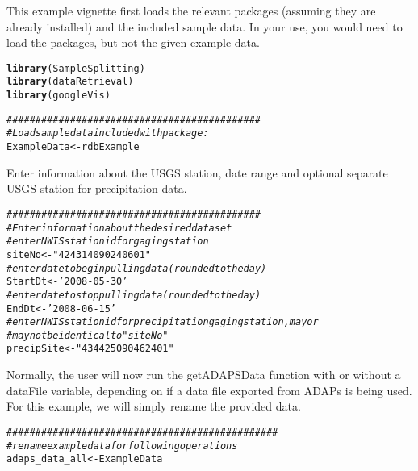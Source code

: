 \documentclass[a4paper,11pt]{article}\usepackage[]{graphicx}\usepackage[]{color}
\makeatletter
\newcommand{\hlstr}[1]{\textcolor[rgb]{0.192,0.494,0.8}{#1}}%
\newcommand{\hlcom}[1]{\textcolor[rgb]{0.678,0.584,0.686}{\textit{#1}}}%
\newcommand{\hlstd}[1]{\textcolor[rgb]{0.345,0.345,0.345}{#1}}%
\newcommand{\hlkwb}[1]{\textcolor[rgb]{0.69,0.353,0.396}{#1}}%
\newcommand{\hlkwd}[1]{\textcolor[rgb]{0.737,0.353,0.396}{\textbf{#1}}}%
\newenvironment{kframe}{%
 \def\at@end@of@kframe{}%
 \ifinner\ifhmode%
  \def\at@end@of@kframe{\end{minipage}}%
  \begin{minipage}{\columnwidth}%
 \fi\fi%
 \def\FrameCommand##1{\hskip\@totalleftmargin \hskip-\fboxsep
 \colorbox{shadecolor}{##1}\hskip-\fboxsep
     \hskip-\linewidth \hskip-\@totalleftmargin \hskip\columnwidth}%
 \MakeFramed {\advance\hsize-\width
   \@totalleftmargin\z@ \linewidth\hsize
   \@setminipage}}%
 {\par\unskip\endMakeFramed%
 \at@end@of@kframe}
\newenvironment{knitrout}{}{} %
\makeatother
\begin{document}
This example vignette first loads the relevant packages (assuming they are already installed) and the included sample data. In your use, you would need to load the packages, but not the given example data. 

\begin{knitrout}
\color{fgcolor}\begin{kframe}
\begin{alltt}
\hlkwd{library}\hlstd{(SampleSplitting)}
\hlkwd{library}\hlstd{(dataRetrieval)}
\hlkwd{library}\hlstd{(googleVis)}

\hlcom{############################################}
\hlcom{# Load sample data included with package:}
\hlstd{ExampleData} \hlkwb{<-} \hlstd{rdbExample}
\end{alltt}
\end{kframe}
\end{knitrout}


Enter information about the USGS station, date range and optional separate USGS station for precipitation data.

\begin{knitrout}
\color{fgcolor}\begin{kframe}
\begin{alltt}
\hlcom{############################################}
\hlcom{# Enter information about the desired data set}
\hlcom{# enter NWIS station id for gaging station}
\hlstd{siteNo} \hlkwb{<-} \hlstr{"424314090240601"}
\hlcom{# enter date to begin pulling data (rounded to the day)}
\hlstd{StartDt} \hlkwb{<-} \hlstr{'2008-05-30'}
\hlcom{# enter date to stop pulling data (rounded to the day)}
\hlstd{EndDt} \hlkwb{<-} \hlstr{'2008-06-15'}
\hlcom{# enter NWIS station id for precipitation gaging station, may or }
\hlcom{# may not be identical to "siteNo"}
\hlstd{precipSite} \hlkwb{<-} \hlstr{"434425090462401"}
\end{alltt}
\end{kframe}
\end{knitrout}


Normally, the user will now run the getADAPSData function with or without a dataFile variable, depending on if a data file exported from ADAPs is being used. For this example, we will simply rename the provided data.

\begin{knitrout}
\color{fgcolor}\begin{kframe}
\begin{alltt}
\hlcom{###############################################}
\hlcom{# rename example data for following operations}
\hlstd{adaps_data_all} \hlkwb{<-} \hlstd{ExampleData}
\end{alltt}
\end{kframe}
\end{knitrout}
\end{document}

